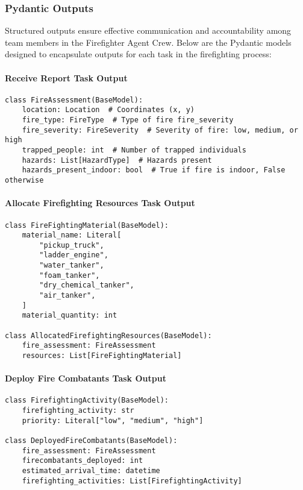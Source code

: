 \subsubsection{Pydantic Outputs}

Structured outputs ensure effective communication and accountability among team members in the Firefighter Agent Crew. Below are the Pydantic models designed to encapsulate outputs for each task in the firefighting process:

\paragraph{Receive Report Task Output}
\begin{lstlisting}[caption={Pydantic model for Receive Report Task Output}]
class FireAssessment(BaseModel):
    location: Location  # Coordinates (x, y)
    fire_type: FireType  # Type of fire fire_severity
    fire_severity: FireSeverity  # Severity of fire: low, medium, or high
    trapped_people: int  # Number of trapped individuals
    hazards: List[HazardType]  # Hazards present
    hazards_present_indoor: bool  # True if fire is indoor, False otherwise
\end{lstlisting}


\paragraph{Allocate Firefighting Resources Task Output}
\begin{lstlisting}[caption={Pydantic model for Allocate Firefighting Resources Task Output}]
class FireFightingMaterial(BaseModel):
    material_name: Literal[
        "pickup_truck",
        "ladder_engine",
        "water_tanker",
        "foam_tanker",
        "dry_chemical_tanker",
        "air_tanker",
    ]
    material_quantity: int

class AllocatedFirefightingResources(BaseModel):
    fire_assessment: FireAssessment
    resources: List[FireFightingMaterial]
\end{lstlisting}


\paragraph{Deploy Fire Combatants Task Output}
\begin{lstlisting}[caption={Pydantic model for Deploy Fire Combatants Task Output}]
class FirefightingActivity(BaseModel):
    firefighting_activity: str
    priority: Literal["low", "medium", "high"]

class DeployedFireCombatants(BaseModel):
    fire_assessment: FireAssessment
    firecombatants_deployed: int
    estimated_arrival_time: datetime
    firefighting_activities: List[FirefightingActivity]
\end{lstlisting}


